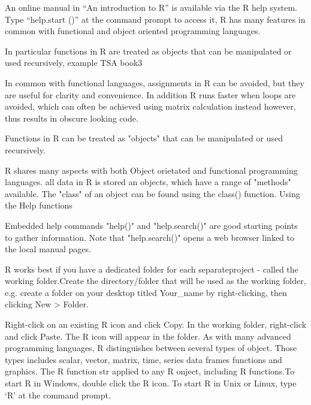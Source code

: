 \begin{frame}
\begin{frame}
An online manual in “An introduction to R” is available via the R help system. Type “help.start ()” at the command prompt to access it, R   has many features in common with functional and object oriented programming languages.



In particular functions in R are treated as objects that can be manipulated or used recursively, example TSA book3

In common with functional languages, assignments in R can be avoided, but they are useful for clarity and convenience. In addition R runs faster when loops are avoided, which can often be achieved using matrix calculation instead however, thus results in obscure looking code.

\end{frame}
\begin{frame}

Functions in R can be treated as "objects" that can be manipulated or used recursively.

R shares many aspects with both Object orietated and functional programming languages. all data in R is stored an objects, which have a range of "methods" available. The "class" of an object can be found using the class() function.
Using the Help functions

\end{frame}
\begin{frame}
Embedded help commands "help()" and "help.search()" are good starting points to gather information.
Note that "help.search()" opens a web browser linked to the local manual pages.
 

R works best if you have a dedicated folder for each separateproject - called the working folder.Create the directory/folder that will be used as the working folder, e.g. create a folder on your desktop titled Your_name by right-clicking, then clicking New > Folder. 
 
Right-click on an existing R icon and click Copy.   In the working folder, right-click and click Paste. The R icon will appear in the folder. As with many advanced programming languages, R distinguishes between several types of object. Those types includes scalar, vector, matrix, time, series data frames functions and graphics. The R function str applied to any R onject, including R functions.To start R in Windows, double click the R icon. To start R in Unix or Linux, type ‘R’ at the command prompt. 


\end{frame}
\end{frame}

